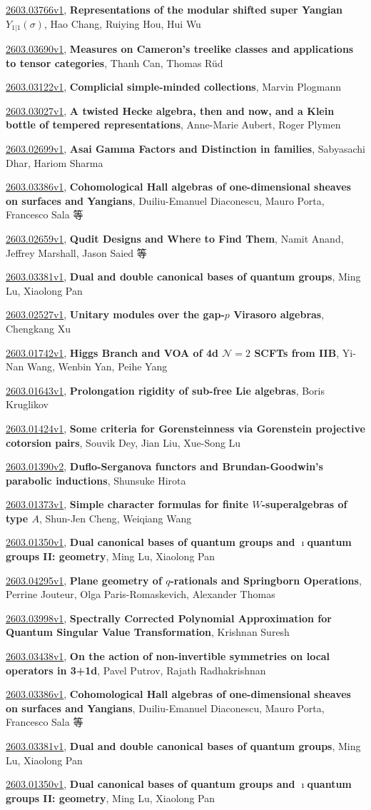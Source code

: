 \documentclass[9pt, a4paper]{article}
\theoremstyle{plain}
\theoremstyle{definition}
\theoremstyle{remark}
\newcommand{\arxiv}[3]{\href{https://arxiv.org/abs/#1}{#1}, \textbf{\textcolor{arxivblue}{#2}}, #3}
\begin{document}
\arxiv{2603.03766v1}{Representations of the modular shifted super Yangian $Y_{1|1}(σ)$}{Hao Chang, Ruiying Hou, Hui Wu}

\arxiv{2603.03690v1}{Measures on Cameron's treelike classes and applications to tensor categories}{Thanh Can, Thomas Rüd}

\arxiv{2603.03122v1}{Complicial simple-minded collections}{Marvin Plogmann}

\arxiv{2603.03027v1}{A twisted Hecke algebra, then and now, and a Klein bottle of tempered representations}{Anne-Marie Aubert, Roger Plymen}

\arxiv{2603.02699v1}{Asai Gamma Factors and Distinction in families}{Sabyasachi Dhar, Hariom Sharma}

\arxiv{2603.03386v1}{Cohomological Hall algebras of one-dimensional sheaves on surfaces and Yangians}{Duiliu-Emanuel Diaconescu, Mauro Porta, Francesco Sala 等}

\arxiv{2603.02659v1}{Qudit Designs and Where to Find Them}{Namit Anand, Jeffrey Marshall, Jason Saied 等}

\arxiv{2603.03381v1}{Dual and double canonical bases of quantum groups}{Ming Lu, Xiaolong Pan}

\arxiv{2603.02527v1}{Unitary modules over the gap-$p$ Virasoro algebras}{Chengkang Xu}

\arxiv{2603.01742v1}{Higgs Branch and VOA of 4d $\mathcal{N}=2$ SCFTs from IIB}{Yi-Nan Wang, Wenbin Yan, Peihe Yang}

\arxiv{2603.01643v1}{Prolongation rigidity of sub-free Lie algebras}{Boris Kruglikov}

\arxiv{2603.01424v1}{Some criteria for Gorensteinness via Gorenstein projective cotorsion pairs}{Souvik Dey, Jian Liu, Xue-Song Lu}

\arxiv{2603.01390v2}{Duflo-Serganova functors and Brundan-Goodwin's parabolic inductions}{Shunsuke Hirota}

\arxiv{2603.01373v1}{Simple character formulas for finite $W$-superalgebras of type $A$}{Shun-Jen Cheng, Weiqiang Wang}

\arxiv{2603.01350v1}{Dual canonical bases of quantum groups and $\imath$quantum groups II: geometry}{Ming Lu, Xiaolong Pan}

\arxiv{2603.04295v1}{Plane geometry of $q$-rationals and Springborn Operations}{Perrine Jouteur, Olga Paris-Romaskevich, Alexander Thomas}

\arxiv{2603.03998v1}{Spectrally Corrected Polynomial Approximation for Quantum Singular Value Transformation}{Krishnan Suresh}

\arxiv{2603.03438v1}{On the action of non-invertible symmetries on local operators in 3+1d}{Pavel Putrov, Rajath Radhakrishnan}

\arxiv{2603.03386v1}{Cohomological Hall algebras of one-dimensional sheaves on surfaces and Yangians}{Duiliu-Emanuel Diaconescu, Mauro Porta, Francesco Sala 等}

\arxiv{2603.03381v1}{Dual and double canonical bases of quantum groups}{Ming Lu, Xiaolong Pan}

\arxiv{2603.01350v1}{Dual canonical bases of quantum groups and $\imath$quantum groups II: geometry}{Ming Lu, Xiaolong Pan}

\end{document}
